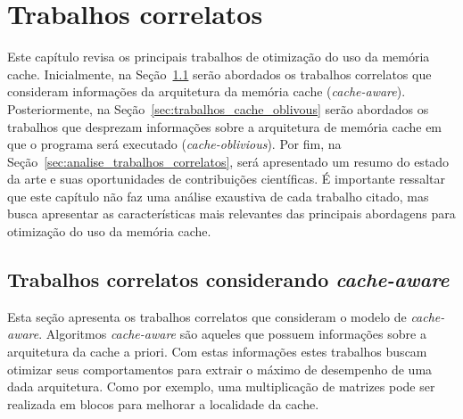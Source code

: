 \chapter{Trabalhos correlatos}
\label{cap:trabalhos_correlatos}

Este capítulo revisa os principais trabalhos de otimização do uso da memória cache.
Inicialmente, na Seção~\ref{sec:trabalhos_cache_aware} serão abordados os trabalhos correlatos que consideram informações da arquitetura da memória cache (\textit{cache-aware}).
Posteriormente, na Seção~\ref{sec:trabalhos_cache_oblivous} serão abordados os trabalhos que desprezam informações sobre a arquitetura de memória cache em que o programa será executado (\textit{cache-oblivious}).
Por fim, na Seção~\ref{sec:analise_trabalhos_correlatos}, será apresentado um resumo do estado da arte e suas oportunidades de contribuições científicas.
É importante ressaltar que este capítulo não faz uma análise exaustiva de cada trabalho citado, mas busca apresentar as características mais relevantes das principais abordagens para otimização do uso da memória cache.

\section{Trabalhos correlatos considerando \textit{cache-aware}}
\label{sec:trabalhos_cache_aware}

Esta seção apresenta os trabalhos correlatos que consideram o modelo de \textit{cache-aware}.
Algoritmos \textit{cache-aware} são aqueles que possuem informações sobre a arquitetura da cache a priori.
Com estas informações estes trabalhos buscam otimizar seus comportamentos para extrair o máximo de desempenho de uma dada arquitetura.
Como por exemplo, uma multiplicação de matrizes pode ser realizada em blocos para melhorar a localidade da cache.

